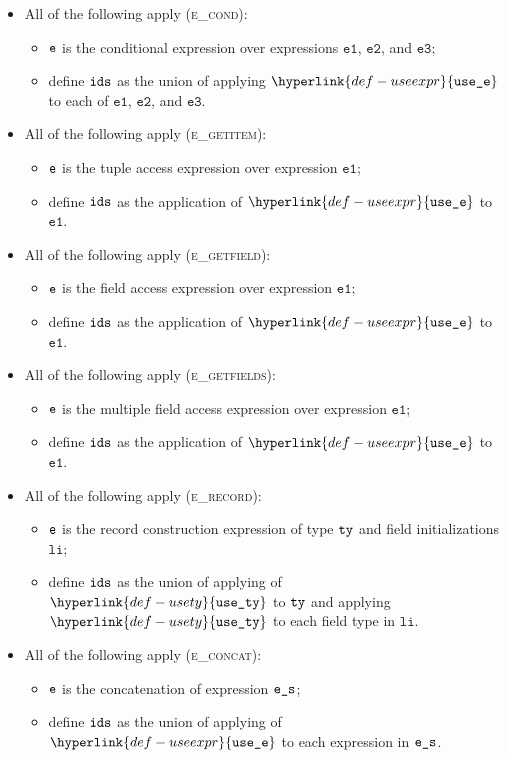 \documentclass{book}
\newcommand\usety[0]{\hyperlink{def-usety}{\texttt{use\_ty}}}
\newcommand\useexpr[0]{\hyperlink{def-useexpr}{\texttt{use\_e}}}
\newcommand\veone[0]{\texttt{e1}}
\newcommand\vetwo[0]{\texttt{e2}}
\newcommand\vethree[0]{\texttt{e3}}
\newcommand\vli[0]{\texttt{li}}
\begin{document}
\begin{itemize}
  \item All of the following apply (\textsc{e\_cond}):
  \begin{itemize}
    \item $\texttt{e}$ is the conditional expression over expressions $\veone$, $\vetwo$, and $\vethree$;
    \item define $\texttt{ids}$ as the union of applying $\useexpr$ to each of $\veone$, $\vetwo$, and $\vethree$.
  \end{itemize}

  \item All of the following apply (\textsc{e\_getitem}):
  \begin{itemize}
    \item $\texttt{e}$ is the tuple access expression over expression $\veone$;
    \item define $\texttt{ids}$ as the application of $\useexpr$ to $\veone$.
  \end{itemize}

  \item All of the following apply (\textsc{e\_getfield}):
  \begin{itemize}
    \item $\texttt{e}$ is the field access expression over expression $\veone$;
    \item define $\texttt{ids}$ as the application of $\useexpr$ to $\veone$.
  \end{itemize}

  \item All of the following apply (\textsc{e\_getfields}):
  \begin{itemize}
    \item $\texttt{e}$ is the multiple field access expression over expression $\veone$;
    \item define $\texttt{ids}$ as the application of $\useexpr$ to $\veone$.
  \end{itemize}

  \item All of the following apply (\textsc{e\_record}):
  \begin{itemize}
    \item $\texttt{e}$ is the record construction expression of type $\texttt{ty}$ and field initializations $\vli$;
    \item define $\texttt{ids}$ as the union of applying of $\usety$ to $\texttt{ty}$ and applying $\usety$ to each field type in $\vli$.
  \end{itemize}

  \item All of the following apply (\textsc{e\_concat}):
  \begin{itemize}
    \item $\texttt{e}$ is the concatenation of expression $\texttt{e\_s}$;
    \item define $\texttt{ids}$ as the union of applying of $\useexpr$ to each expression in $\texttt{e\_s}$.
  \end{itemize}


\end{itemize}
\end{document}
